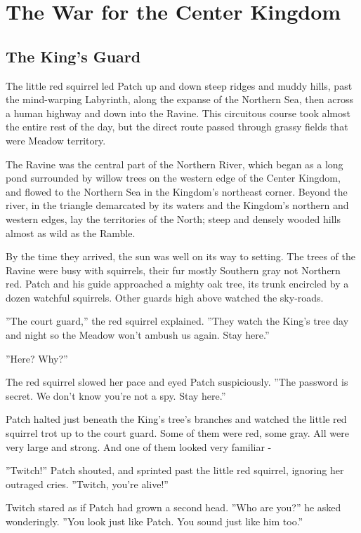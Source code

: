 \documentclass[12pt]{book}
\begin{document}

\chapter{The War for the Center Kingdom}

\section{The King's Guard}

The little red squirrel led Patch up and down steep ridges and muddy
hills, past the mind-warping Labyrinth, along the expanse of the
Northern Sea, then across a human highway and down into the
Ravine. This circuitous course took almost the entire rest of the day,
but the direct route passed through grassy fields that were Meadow
territory.

The Ravine was the central part of the Northern River, which began as
a long pond surrounded by willow trees on the western edge of the
Center Kingdom, and flowed to the Northern Sea in the Kingdom's
northeast corner. Beyond the river, in the triangle demarcated by its
waters and the Kingdom's northern and western edges, lay the
territories of the North; steep and densely wooded hills almost as
wild as the Ramble.

By the time they arrived, the sun was well on its way to setting. The
trees of the Ravine were busy with squirrels, their fur mostly
Southern gray not Northern red. Patch and his guide approached a
mighty oak tree, its trunk encircled by a dozen watchful
squirrels. Other guards high above watched the sky-roads.

''The court guard,'' the red squirrel explained. ''They watch the
King's tree day and night so the Meadow won't ambush us again. Stay
here.''

''Here? Why?''

The red squirrel slowed her pace and eyed Patch suspiciously. ''The
password is secret. We don't know you're not a spy. Stay here.''

Patch halted just beneath the King's tree's branches and watched the
little red squirrel trot up to the court guard. Some of them were red,
some gray. All were very large and strong. And one of them looked very
familiar -

''Twitch!'' Patch shouted, and sprinted past the little red squirrel,
ignoring her outraged cries. ''Twitch, you're alive!''

Twitch stared as if Patch had grown a second head. ''Who are you?'' he
asked wonderingly. ''You look just like Patch. You sound just like him
too.''
\end{document}
